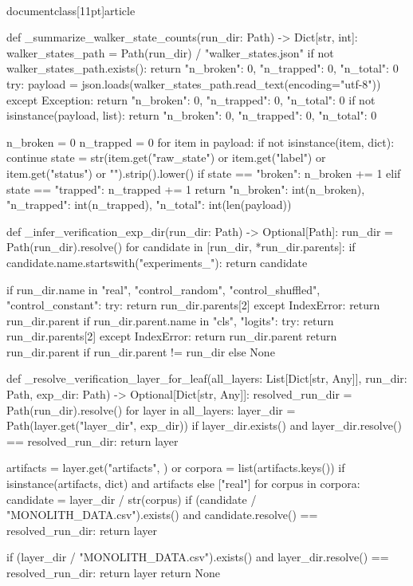 \\documentclass[11pt]{article}
\begin{document}
\begin{CodeBlock}
def _summarize_walker_state_counts(run_dir: Path) -> Dict[str, int]:
    walker_states_path = Path(run_dir) / "walker_states.json"
    if not walker_states_path.exists():
        return {"n_broken": 0, "n_trapped": 0, "n_total": 0}
    try:
        payload = json.loads(walker_states_path.read_text(encoding="utf-8"))
    except Exception:
        return {"n_broken": 0, "n_trapped": 0, "n_total": 0}
    if not isinstance(payload, list):
        return {"n_broken": 0, "n_trapped": 0, "n_total": 0}

    n_broken = 0
    n_trapped = 0
    for item in payload:
        if not isinstance(item, dict):
            continue
        state = str(item.get("raw_state") or item.get("label") or item.get("status") or "").strip().lower()
        if state == "broken":
            n_broken += 1
        elif state == "trapped":
            n_trapped += 1
    return {"n_broken": int(n_broken), "n_trapped": int(n_trapped), "n_total": int(len(payload))}


def _infer_verification_exp_dir(run_dir: Path) -> Optional[Path]:
    run_dir = Path(run_dir).resolve()
    for candidate in [run_dir, *run_dir.parents]:
        if candidate.name.startswith("experiments_"):
            return candidate

    if run_dir.name in {"real", "control_random", "control_shuffled", "control_constant"}:
        try:
            return run_dir.parents[2]
        except IndexError:
            return run_dir.parent
    if run_dir.parent.name in {"cls", "logits"}:
        try:
            return run_dir.parents[2]
        except IndexError:
            return run_dir.parent
    return run_dir.parent if run_dir.parent != run_dir else None


def _resolve_verification_layer_for_leaf(all_layers: List[Dict[str, Any]], run_dir: Path, exp_dir: Path) -> Optional[Dict[str, Any]]:
    resolved_run_dir = Path(run_dir).resolve()
    for layer in all_layers:
        layer_dir = Path(layer.get("layer_dir", exp_dir))
        if layer_dir.exists() and layer_dir.resolve() == resolved_run_dir:
            return layer

        artifacts = layer.get("artifacts", {}) or {}
        corpora = list(artifacts.keys()) if isinstance(artifacts, dict) and artifacts else ["real"]
        for corpus in corpora:
            candidate = layer_dir / str(corpus)
            if (candidate / "MONOLITH_DATA.csv").exists() and candidate.resolve() == resolved_run_dir:
                return layer

        if (layer_dir / "MONOLITH_DATA.csv").exists() and layer_dir.resolve() == resolved_run_dir:
            return layer
    return None



\end{CodeBlock}
\end{document}
